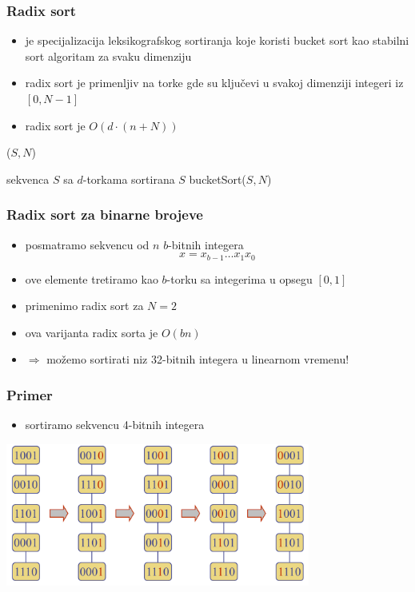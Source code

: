 \documentclass[compress]{beamer}
\begin{document}
\begin{frame}
  \frametitle{Radix sort}
  \begin{itemize}
    \item {} je specijalizacija leksikografskog sortiranja koje koristi bucket sort kao stabilni sort algoritam za svaku dimenziju
    \item radix sort je primenljiv na torke gde su ključevi u svakoj dimenziji integeri iz $[0,N-1]$
    \item radix sort je $O(d\cdot (n+N))$
  \end{itemize}
($S, N$)
\begin{algorithmic}
\REQUIRE sekvenca $S$ sa $d$-torkama
\ENSURE sortirana $S$
  \STATE bucketSort($S, N$)
\ENDFOR
\end{algorithmic}
\end{frame}

\begin{frame}
  \frametitle{Radix sort za binarne brojeve}
  \begin{itemize}
    \item posmatramo sekvencu od $n$ $b$-bitnih integera
    $$x = x_{b-1} \ldots x_1 x_0$$
    \item ove elemente tretiramo kao $b$-torku sa integerima u opsegu $[0,1]$
    \item primenimo radix sort za $N=2$
    \item ova varijanta radix sorta je $O(bn)$
    \item $\Rightarrow$ možemo sortirati niz 32-bitnih integera u linearnom vremenu!
  \end{itemize}
\end{frame}

\begin{frame}
  \frametitle{Primer}
  \begin{itemize}
    \item sortiramo sekvencu 4-bitnih integera
  \end{itemize}
  \begin{center}
    \includegraphics[width=10cm]{asp-12-pic34.png}
  \end{center}
\end{frame}
\end{document}
